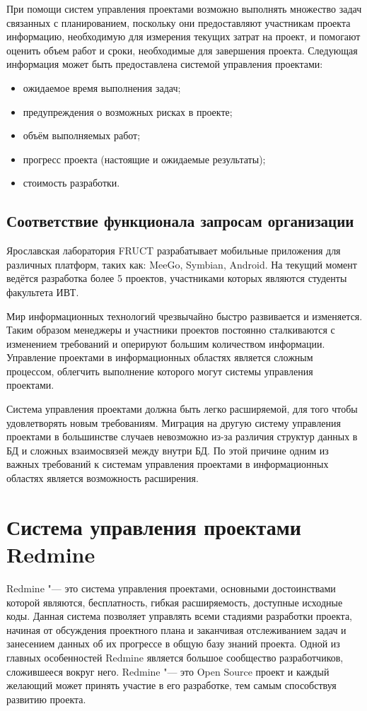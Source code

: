 При помощи систем управления проектами возможно выполнять множество задач
связанных с планированием, поскольку они предоставляют участникам проекта
информацию, необходимую для измерения текущих затрат на проект, и помогают
оценить объем работ и сроки, необходимые для завершения проекта. Следующая
информация может быть предоставлена системой управления проектами:
\begin{itemize}
  \item ожидаемое время выполнения задач;
  \item предупреждения о возможных рисках в проекте;
  \item объём выполняемых работ;
  \item прогресс проекта (настоящие и ожидаемые результаты);
  \item стоимость разработки.
\end{itemize}

\subsection{Соответствие функционала запросам организации}
Ярославская лаборатория FRUCT \cite{yarfruct} разрабатывает мобильные
приложения для различных платформ, таких как: MeeGo, Symbian, Android. На
текущий момент ведётся разработка более 5 проектов, участниками которых
являются студенты факультета ИВТ.

Мир информационных технологий чрезвычайно быстро развивается и изменяется.
Таким образом менеджеры и участники проектов постоянно сталкиваются с
изменением требований и оперируют большим количеством информации. Управление
проектами в информационных областях является сложным процессом, облегчить
выполнение которого могут системы управления проектами.

Система управления проектами должна быть легко расширяемой, для того чтобы
удовлетворять новым требованиям. Миграция на другую систему управления
проектами в большинстве случаев невозможно из-за различия структур данных в БД
и сложных взаимосвязей между внутри БД. По этой причине одним из важных
требований к системам управления проектами в информационных областях является
возможность расширения.

\section{Система управления проектами Redmine}
Redmine \cite{redmine} "--- это система управления проектами, основными
достоинствами которой являются, бесплатность, гибкая расширяемость, доступные
исходные коды. Данная система позволяет управлять всеми стадиями разработки
проекта, начиная от обсуждения проектного плана и заканчивая отслеживанием
задач и занесением данных об их прогрессе в общую базу знаний проекта. Одной из
главных особенностей Redmine является большое сообщество разработчиков,
сложившееся вокруг него. Redmine "--- это Open Source проект и каждый желающий
может принять участие в его разработке, тем самым способствуя развитию проекта.

